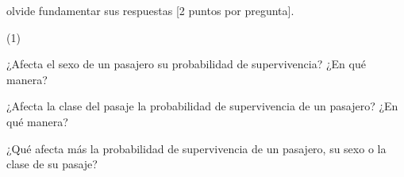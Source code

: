 \documentclass{cdplf-prueba}
\begin{document}
olvide fundamentar sus respuestas [2 puntos por pregunta].
%
\begin{tasks}[label={\tcbox[colback=black!60, colframe=black!60, coltext=white, on line, boxsep=0pt, left=3pt, right=3pt, top=2pt, bottom=2pt]{\sffamily\bfseries\Alph*}},
    item-indent=1.2cm,column-sep=20pt,label-offset=0.3cm,label-width=15pt,after-item-skip=10pt](1)
    \task \raggedright ¿Afecta el sexo de un pasajero su probabilidad de supervivencia? ¿En qué manera?
    \vspace{5pt}\begin{respuesta}[height=2cm]\end{respuesta}
    \task \raggedright ¿Afecta la clase del pasaje la probabilidad de supervivencia de un pasajero? ¿En qué manera?
    \vspace{5pt}\begin{respuesta}[height=2cm]\end{respuesta}
    \task ¿Qué afecta más la probabilidad de supervivencia de un pasajero, su sexo o la clase de su pasaje?
    \vspace{5pt}\begin{respuesta}[height=3cm]\end{respuesta}
\end{tasks}
\end{document}

